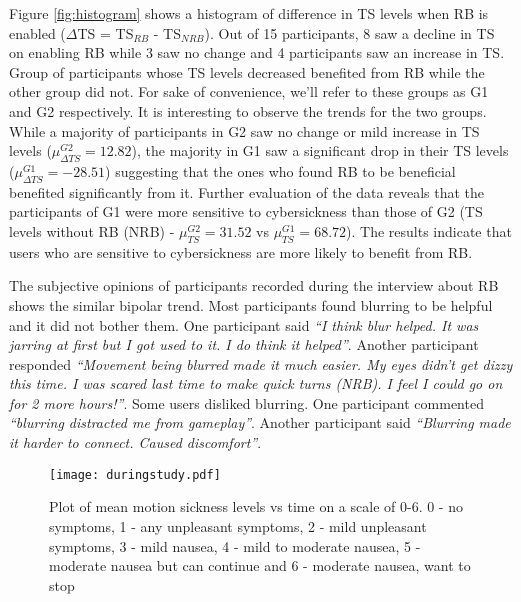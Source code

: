 \documentclass{vgtc}                          %
\begin{document}
Figure \ref{fig:histogram} shows a histogram of difference in TS levels when RB is enabled ($\Delta$TS = TS$_{RB}$ - TS$_{NRB}$). Out of 15 participants, 8 saw a decline in TS on enabling RB while 3 saw no change and 4 participants saw an increase in TS. Group of participants whose TS levels decreased benefited from RB while the other group did not. For sake of convenience, we'll refer to these groups as G1 and G2 respectively. It is interesting to observe the trends for the two groups. While a majority of participants in G2 saw no change or mild increase in TS levels ($\mu^{G2}_{\Delta TS} = 12.82$), the majority in G1 saw a significant drop in their TS levels ($\mu^{G1}_{\Delta TS} = -28.51$) suggesting that the ones who found RB to be beneficial benefited significantly from it. Further evaluation of the data reveals that the participants of G1 were more sensitive to cybersickness than those of G2 (TS levels without RB (NRB) - $\mu^{G2}_{TS} = 31.52$ vs $\mu^{G1}_{TS} = 68.72$). The results indicate that users who are sensitive to cybersickness are more likely to benefit from RB.


The subjective opinions of participants recorded during the interview about RB shows the similar bipolar trend. Most participants found blurring to be helpful and it did not bother them. One participant said \emph{``I think blur helped. It was jarring at first but I got used to it. I do think it helped''}. Another participant responded \emph{``Movement being blurred made it much easier. My eyes didn't get dizzy this time. I was scared last time to make quick turns (NRB). I feel I could go on for 2 more hours!''}. Some users disliked blurring. One participant commented \emph{``blurring distracted me from gameplay''}. Another participant said \emph{``Blurring made it harder to connect. Caused discomfort''}.

\begin{figure}[h]
\vspace{-8pt}
	\centering
	
	\texttt{[image: duringstudy.pdf]}
	\vspace{-12pt}
	\caption{ Plot of mean motion sickness levels vs time on a scale of 0-6. 0 - no symptoms, 1 - any unpleasant symptoms, 2 - mild unpleasant symptoms, 3 - mild nausea, 4 - mild to moderate nausea, 5 - moderate nausea but can continue and 6 - moderate nausea, want to stop \vspace{-8pt}}
	\label{fig:nausearate}
		\vspace{-4pt}
\end{figure}
\end{document}
